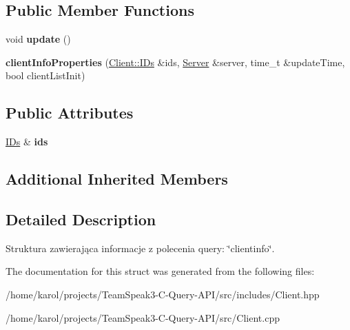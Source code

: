 \subsection*{Public Member Functions}
\begin{DoxyCompactItemize}
\item 
void {\bfseries update} ()\hypertarget{struct_ts3_api_1_1_client_1_1client_info_properties_a310ed4150a0c315531536fdea3d9105b}{}\label{struct_ts3_api_1_1_client_1_1client_info_properties_a310ed4150a0c315531536fdea3d9105b}

\item 
{\bfseries client\+Info\+Properties} (\hyperlink{struct_ts3_api_1_1_client_1_1_i_ds}{Client\+::\+I\+Ds} \&ids, \hyperlink{class_ts3_api_1_1_server}{Server} \&server, time\+\_\+t \&update\+Time, bool client\+List\+Init)\hypertarget{struct_ts3_api_1_1_client_1_1client_info_properties_ac63f19afca704bfd743863a2069c6608}{}\label{struct_ts3_api_1_1_client_1_1client_info_properties_ac63f19afca704bfd743863a2069c6608}

\end{DoxyCompactItemize}
\subsection*{Public Attributes}
\begin{DoxyCompactItemize}
\item 
\hyperlink{struct_ts3_api_1_1_client_1_1_i_ds}{I\+Ds} \& {\bfseries ids}\hypertarget{struct_ts3_api_1_1_client_1_1client_info_properties_ab52bf97518b969ed50bcb8a0ac9b11da}{}\label{struct_ts3_api_1_1_client_1_1client_info_properties_ab52bf97518b969ed50bcb8a0ac9b11da}

\end{DoxyCompactItemize}
\subsection*{Additional Inherited Members}


\subsection{Detailed Description}
Struktura zawierająca informacje z polecenia query\+: \char`\"{}clientinfo\char`\"{}. 

The documentation for this struct was generated from the following files\+:\begin{DoxyCompactItemize}
\item 
/home/karol/projects/\+Team\+Speak3-\/\+C-\/\+Query-\/\+A\+P\+I/src/includes/Client.\+hpp\item 
/home/karol/projects/\+Team\+Speak3-\/\+C-\/\+Query-\/\+A\+P\+I/src/Client.\+cpp\end{DoxyCompactItemize}
